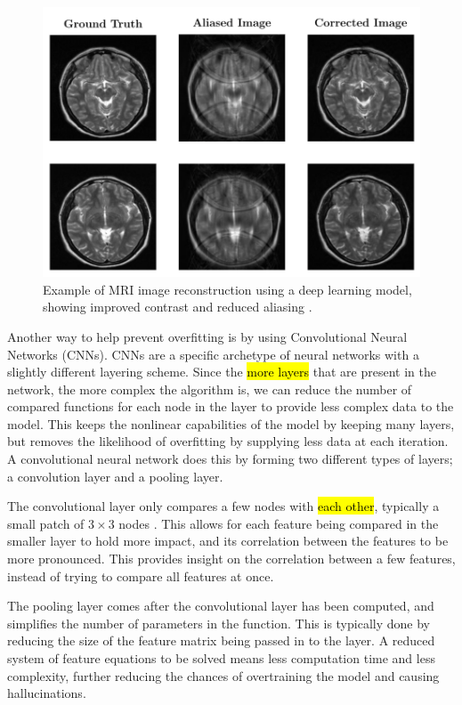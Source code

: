 \documentclass[14pt]{extreport}
\begin{document}
        \begin{figure}[h]
            \begin{center}
                \includegraphics[width = 0.6\linewidth]{Brain Images Corrected.png}
                \caption{Example of MRI image reconstruction using a deep learning model, showing improved contrast and reduced aliasing \cite{Hyun_Kim_Lee_Lee_Seo_2018}.}
            \end{center}
        \end{figure}

        Another way to help prevent overfitting is by using Convolutional Neural Networks (CNNs). CNNs are a specific archetype of neural networks with a slightly different layering scheme. Since the \hl{more layers} that are present in the network, the more complex the algorithm is, we can reduce the number of compared functions for each node in the layer to provide less complex data to the model. This keeps the nonlinear capabilities of the model by keeping many layers, but removes the likelihood of overfitting by supplying less data at each iteration. A convolutional neural network does this by forming two different types of layers; a convolution layer and a pooling layer. 

        The convolutional layer only compares a few nodes with \hl{each other}, typically a small patch of $3\times3$ nodes \cite{Liu_Pan_Li_Chen_Tang_Lu_Wang_2018}. This allows for each feature being compared in the smaller layer to hold more impact, and its correlation between the features to be more pronounced. This provides insight on the correlation between a few features, instead of trying to compare all features at once.

        The pooling layer comes after the convolutional layer has been computed, and simplifies the number of parameters in the function. This is typically done by reducing the size of the feature matrix being passed in to the layer. A reduced system of feature equations to be solved means less computation time and less complexity, further reducing the chances of overtraining the model and causing hallucinations.
\end{document}
